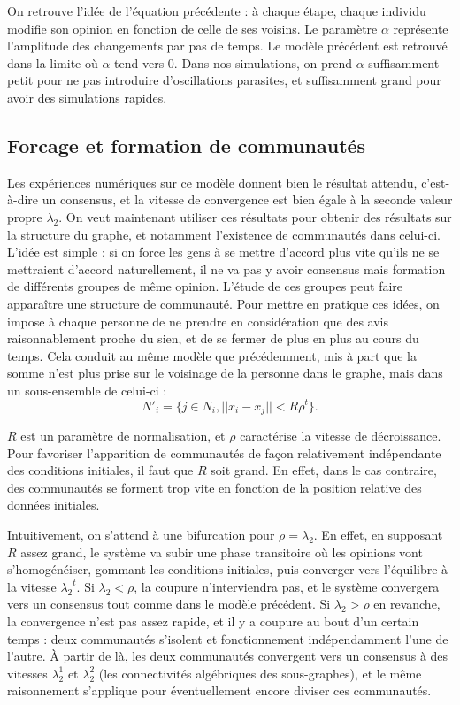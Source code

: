 \documentclass[12pt]{article}
\begin{document}
On retrouve l'idée de l'équation précédente : à chaque étape, chaque
individu modifie son opinion en fonction de celle de ses voisins. Le
paramètre $\alpha$ représente l'amplitude des changements par pas de
temps. Le modèle précédent est retrouvé dans la limite où $\alpha$
tend vers 0. Dans nos simulations, on prend $\alpha$ suffisamment
petit pour ne pas introduire d'oscillations parasites, et suffisamment
grand pour avoir des simulations rapides.

\subsection{Forcage et formation de communautés}
\label{forcage}
Les expériences numériques sur ce modèle donnent bien le résultat
attendu, c'est-à-dire un consensus, et la vitesse de convergence est
bien égale à la seconde valeur propre $\lambda_2$. On veut maintenant
utiliser ces résultats pour obtenir des résultats sur la structure du
graphe, et notamment l'existence de communautés dans celui-ci. L'idée
est simple : si on force les gens à se mettre d'accord plus vite
qu'ils ne se mettraient d'accord naturellement, il ne va pas y avoir
consensus mais formation de différents groupes de même
opinion. L'étude de ces groupes peut faire apparaître une structure de
communauté. Pour mettre en pratique ces idées, on impose à chaque
personne de ne prendre en considération que des avis raisonnablement
proche du sien, et de se fermer de plus en plus au cours du
temps. Cela conduit au même modèle que précédemment, mis à part que la
somme n'est plus prise sur le voisinage de la personne dans le graphe,
mais dans un sous-ensemble de celui-ci : $$N'_{i} = \{j \in N_i, ||x_i
- x_j|| < R \rho^t\}.$$

$R$ est un paramètre de normalisation, et $\rho$ caractérise la
vitesse de décroissance. Pour favoriser l'apparition de communautés
de façon relativement indépendante des conditions initiales, il faut
que $R$ soit grand. En effet, dans le cas contraire, des communautés
se forment trop vite en fonction de la position relative des données
initiales.

Intuitivement, on s'attend à une bifurcation pour $\rho =
\lambda_2$. En effet, en supposant $R$ assez grand, le système va
subir une phase transitoire où les opinions vont s'homogénéiser,
gommant les conditions initiales, puis converger vers l'équilibre à
la vitesse ${\lambda_2}^t$. Si $\lambda_2 < \rho$, la coupure
n'interviendra pas, et le système convergera vers un consensus tout
comme dans le modèle précédent. Si $\lambda_2 > \rho$ en revanche,
la convergence n'est pas assez rapide, et il y a coupure au bout
d'un certain temps : deux communautés s'isolent et fonctionnement
indépendamment l'une de l'autre. À partir de là, les deux
communautés convergent vers un consensus à des vitesses
$\lambda_2^1$ et $\lambda_2^2$ (les connectivités algébriques des
sous-graphes), et le même raisonnement s'applique pour
éventuellement encore diviser ces communautés.
\end{document}
